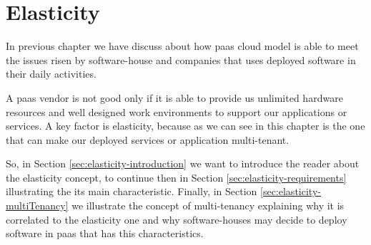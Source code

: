 %
%
\chapter{Elasticity}
\label{cap:solutionSpace}
In previous chapter we have discuss about how \ac{paas} cloud model is able to meet the issues risen
by software-house and companies that uses deployed software in their daily activities.

A \ac{paas} vendor is not good only if it is able to provide us unlimited hardware resources and well
designed work environments to support our applications or services. A key factor is elasticity, because
as we can see in this chapter is the one that can make our deployed services or application multi-tenant.

So, in Section \ref{sec:elasticity-introduction} we want to introduce the reader about the elasticity
concept, to continue then in Section \ref{sec:elasticity-requirements} illustrating the its main
characteristic. Finally, in Section \ref{sec:elasticity-multiTenancy} we illustrate the concept of
multi-tenancy explaining why it is correlated to the elasticity one and why software-houses may
decide to deploy software in \ac{paas} that has this characteristics.







